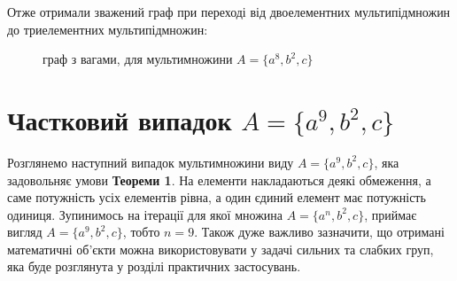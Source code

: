 Отже отримали зважений граф при переході від двоелементних мультипідмножин до триелементних мультипідмножин:
\begin{figure}
\begin{center}
\end{center}
\caption{граф з вагами, для мультимножини  $ A = \{a^8, b^2, c\} $}
\end{figure}


\section{Частковий випадок $A = \{a^9, b^2, c\}$}

Розглянемо наступний випадок мультимножини виду $A = \{a^9, b^2, c\}$, яка задовольняє умови {\bf Теореми 1}. На елементи накладаються деякі обмеження, а саме потужність усіх елементів рівна, а один єдиний елемент має потужність одиниця. Зупинимось на ітерації для якої множина  $A = \{a^n, b^2, c\}$, приймає вигляд $A = \{a^9, b^2, c\}$, тобто $n = 9$. Також дуже важливо зазначити, що отримані математичні об'єкти можна використовувати у задачі сильних та слабких груп, яка буде розглянута у розділі практичних застосувань.

